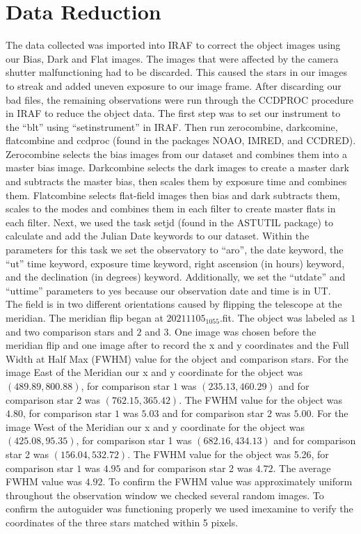 \section{Data Reduction}
\label{sec:data}

The data collected was imported into IRAF to correct the object images using our Bias, 
Dark and Flat images. The images that were affected by the camera shutter malfunctioning 
had to be discarded. This caused the stars in our images to streak and added uneven exposure 
to our image frame. After discarding our bad files, the remaining observations were run 
through the CCDPROC procedure in IRAF to reduce the object data. The first step was to 
set our instrument to the “blt” using “setinstrument” in IRAF. Then run zerocombine, 
darkcomine, flatcombine and ccdproc (found in the packages NOAO, IMRED, and CCDRED). 
Zerocombine selects the bias images from our dataset and combines them into a master 
bias image. Darkcombine selects the dark images to create a master dark and subtracts 
the master bias, then scales them by exposure time and combines them. Flatcombine selects 
flat-field images then bias and dark subtracts them, scales to the modes and combines 
them in each filter to create master flats in each filter. Next, we used the task setjd 
(found in the ASTUTIL package) to calculate and add the Julian Date keywords to our dataset. 
Within the parameters for this task we set the observatory to “aro”, the date keyword, the 
“ut” time keyword, exposure time keyword, right ascension (in hours) keyword, and the declination 
(in degrees) keyword. Additionally, we set the “utdate” and “uttime” parameters to yes 
because our observation date and time is in UT. \\

\noindent The field is in two different orientations caused by flipping the telescope at the meridian. 
The meridian flip began at $20211105_ 1055$.fit. The object was labeled as $1$ and two comparison 
stars and $2$ and $3$. One image was chosen before the meridian flip and one image after to record
the x and y coordinates and the Full Width at Half Max (FWHM) value for the object and 
comparison stars. For the image East of the Meridian our x and y coordinate for the 
object was $(489.89, 800.88)$, for comparison star $1$ was $(235.13, 460.29)$ and for comparison 
star $2$ was $(762.15, 365.42)$. The FWHM value for the object was $4.80$, for comparison star 
$1$ was $5.03$ and for comparison star $2$ was $5.00$. For the image West of the Meridian our x and 
y coordinate for the object was $(425.08, 95.35)$, for comparison star 1 was $(682.16, 434.13)$ 
and for comparison star 2 was $(156.04, 532.72)$. The FWHM value for the object was 5.26, for 
comparison star $1$ was $4.95$ and for comparison star 2 was $4.72$. The average FWHM value was $4.92$. 
To confirm the FWHM value was approximately uniform throughout the observation window we 
checked several random images. To confirm the autoguider was functioning properly we used 
imexamine to verify the coordinates of the three stars matched within 5 pixels. \\

